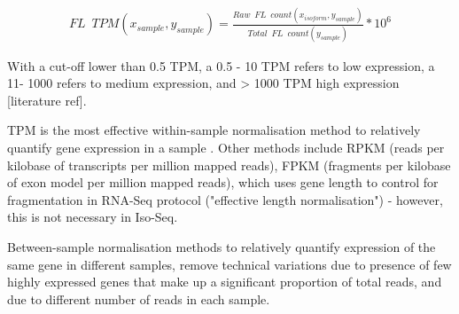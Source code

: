 \begin{align*}
	FL\;\:TPM (x_{sample},y_{sample})=\frac{Raw\;\:FL\;\:count (x_{isoform},y_{sample})}{Total\;\:FL\;\:count (y_{sample})} *10^6
\end{align*}

With a cut-off lower than 0.5 TPM, a 0.5 - 10 TPM refers to low expression, a 11- 1000 refers to medium expression, and > 1000 TPM high expression [literature ref]. 

TPM is the most effective within-sample normalisation method to relatively quantify gene expression in a sample \cite{Abrams2019}. Other methods include RPKM (reads per kilobase of transcripts per million mapped reads), FPKM (fragments per kilobase of exon model per million mapped reads), which uses gene length to control for fragmentation in RNA-Seq protocol ("effective length normalisation") - however, this is not necessary in Iso-Seq.  

Between-sample normalisation methods to relatively quantify expression of the same gene in different samples, remove technical variations due to presence of few highly expressed genes that make up a significant proportion of total reads, and due to different number of reads in each sample. 